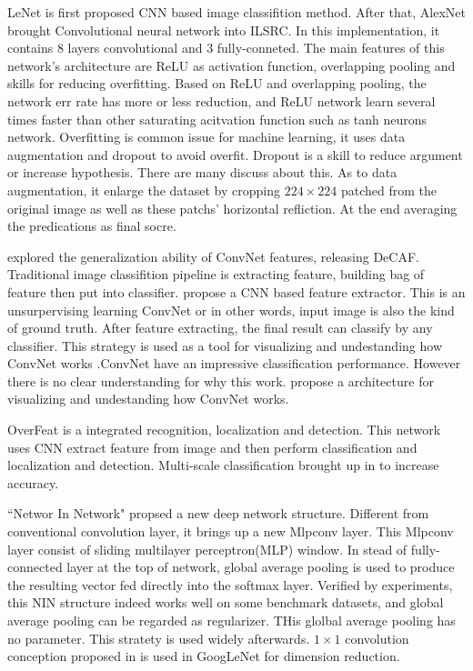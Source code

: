 \documentclass[10pt,twocolumn,letterpaper]{article}
\begin{document}
\par
LeNet\cite{lecun1990handwritten} is first proposed CNN based image classifition method. After that, AlexNet\cite{krizhevsky2012imagenet} brought Convolutional neural network into ILSRC. In this implementation, it contains 8 layers  convolutional and 3 fully-conneted. The main features of this network's architecture are ReLU\cite{nair2010rectified} as activation function, overlapping pooling and skills for reducing overfitting. Based on ReLU and overlapping pooling, the network err rate has more or less reduction, and ReLU network learn several times faster than other saturating acitvation function such as tanh neurons network. Overfitting is common issue for machine learning, it uses data augmentation and dropout to avoid overfit. Dropout is a skill to reduce argument or increase hypothesis. There are many discuss about this. As to data augmentation, it enlarge the dataset by cropping $224\times 224$ patched from the original image as well as these patchs' horizontal refliction. At the end averaging the predications as final socre.
\par
\cite{donahue2014decaf} explored the generalization ability of ConvNet features, releasing DeCAF. Traditional image classifition pipeline is extracting feature, building bag of feature then put into classifier. \cite{zeiler2011adaptive} propose a CNN based feature extractor. This is an unsurpervising learning ConvNet or in other words, input image is also the kind of ground truth. After feature extracting, the final result can classify by any classifier. This strategy is used as a tool for visualizing and undestanding how ConvNet works \cite{zeiler2014visualizing}.ConvNet have an impressive classification performance. However there is no clear understanding for why this work. \cite{zeiler2014visualizing} propose a architecture for visualizing and undestanding how ConvNet works.
\par
OverFeat\cite{sermanet2013overfeat} is a integrated recognition, localization and detection. This network uses CNN extract feature from image and then perform classification and localization and detection. Multi-scale classification brought up in \cite{sermanet2013overfeat} to increase accuracy.
\par
``Networ In Network"\cite{lin2013network} propsed a new deep network structure. Different from conventional convolution layer, it brings up a new Mlpconv layer. This Mlpconv layer consist of sliding multilayer perceptron(MLP) window. In stead of fully-connected layer at the top of network, global average pooling is used to produce the resulting vector fed directly into the softmax layer. Verified by experiments, this NIN structure indeed works well on some benchmark datasets, and global average pooling can be regarded as regularizer. THis glolbal average pooling has no parameter. This stratety is used widely afterwards. $1\times 1$ convolution conception proposed in \cite{lin2013network} is used in GoogLeNet for dimension reduction.
\end{document}
